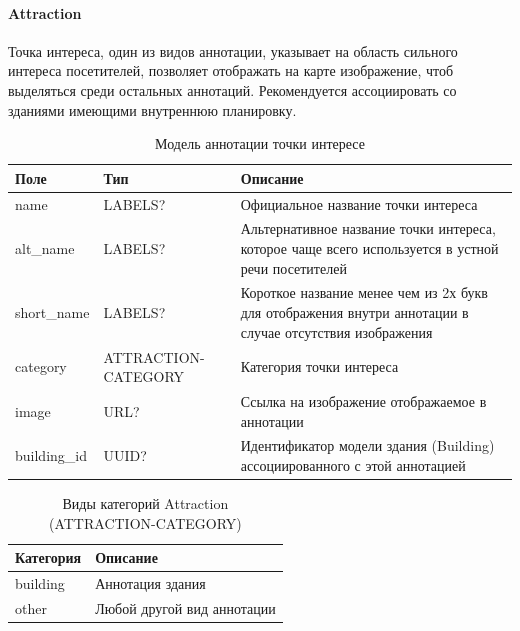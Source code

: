       \paragraph{Attraction}
        Точка интереса, один из видов аннотации, указывает на область сильного интереса посетителей, позволяет отображать на карте изображение, чтоб выделяться среди остальных аннотаций. Рекомендуется ассоциировать со зданиями имеющими внутреннюю планировку.
        \begin{center}
          \begin{xltabular}{\linewidth}{|l|p{4cm}|X|}
            \caption{Модель аннотации точки интересе}\\\hline
            Поле        & Тип                 & Описание                                                                                                \\ \hline
            name        & LABELS?             & Официальное название точки интереса                                                                     \\ \hline
            alt\_name   & LABELS?             & Альтернативное название точки интереса, которое чаще всего используется в устной речи посетителей       \\ \hline
            short\_name & LABELS?             & Короткое название менее чем из 2х букв для отображения внутри аннотации в случае отсутствия изображения \\ \hline
            category    & ATTRACTION-CATEGORY & Категория точки интереса                                                                                \\ \hline
            image       & URL?                & Ссылка на изображение отображаемое в аннотации                                                          \\ \hline
            building\_id& UUID?               & Идентификатор модели здания (Building) ассоциированного с этой аннотацией                               \\ \hline
          \end{xltabular}
        \end{center}
        \begin{center}
          \begin{xltabular}{\linewidth}{|l|X|}
            \caption{Виды категорий Attraction (ATTRACTION-CATEGORY)}\\           \hline
            Категория & Описание                   \\ \hline
            building  & Аннотация здания           \\ \hline
            other     & Любой другой вид аннотации \\ \hline
          \end{xltabular}
        \end{center}

